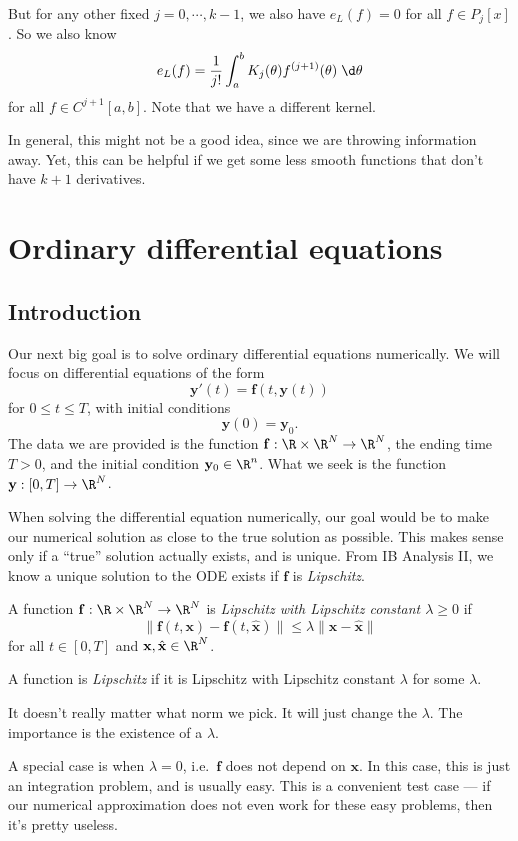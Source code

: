 \documentclass[a4paper]{article}
\begin{document}
But for any other fixed $j = 0, \cdots, k - 1$, we also have $e_L(f) = 0$ for all $f \in P_j[x]$. So we also know
\[
  e_L(f) = \frac{1}{j!} \int_a^b K_j (\theta) f^{(j + 1)}(\theta)\;\d \theta
\]
for all $f \in C^{j + 1}[a, b]$. Note that we have a different kernel.

In general, this might not be a good idea, since we are throwing information away. Yet, this can be helpful if we get some less smooth functions that don't have $k + 1$ derivatives.

\section{Ordinary differential equations}
\subsection{Introduction}
Our next big goal is to solve ordinary differential equations numerically. We will focus on differential equations of the form
\[
  \mathbf{y}'(t) = \mathbf{f}(t, \mathbf{y}(t))
\]
for $0 \leq t \leq T$, with initial conditions
\[
  \mathbf{y}(0) = \mathbf{y}_0.
\]
The data we are provided is the function $\mathbf{f}: \R \times \R^N \to \R^N$, the ending time $T > 0$, and the initial condition $\mathbf{y}_0 \in \R^n$. What we seek is the function $\mathbf{y}: [0, T] \to \R^N$.

When solving the differential equation numerically, our goal would be to make our numerical solution as close to the true solution as possible. This makes sense only if a ``true'' solution actually exists, and is unique. From IB Analysis II, we know a unique solution to the ODE exists if $\mathbf{f}$ is \emph{Lipschitz}.

\begin{defi}
  A function $\mathbf{f}: \R \times \R^N \to \R^N$ is \emph{Lipschitz with Lipschitz constant $\lambda \geq 0$} if
  \[
    \|\mathbf{f}(t, \mathbf{x}) - \mathbf{f}(t, \hat{\mathbf{x}})\| \leq \lambda \|\mathbf{x} - \hat{\mathbf{x}}\|
  \]
  for all $t \in [0, T]$ and $\mathbf{x}, \hat{\mathbf{x}} \in \R^N$.

  A function is \emph{Lipschitz} if it is Lipschitz with Lipschitz constant $\lambda$ for some $\lambda$.
\end{defi}
It doesn't really matter what norm we pick. It will just change the $\lambda$. The importance is the existence of a $\lambda$.

A special case is when $\lambda = 0$, i.e.\ $\mathbf{f}$ does not depend on $\mathbf{x}$. In this case, this is just an integration problem, and is usually easy. This is a convenient test case --- if our numerical approximation does not even work for these easy problems, then it's pretty useless.
\end{document}
